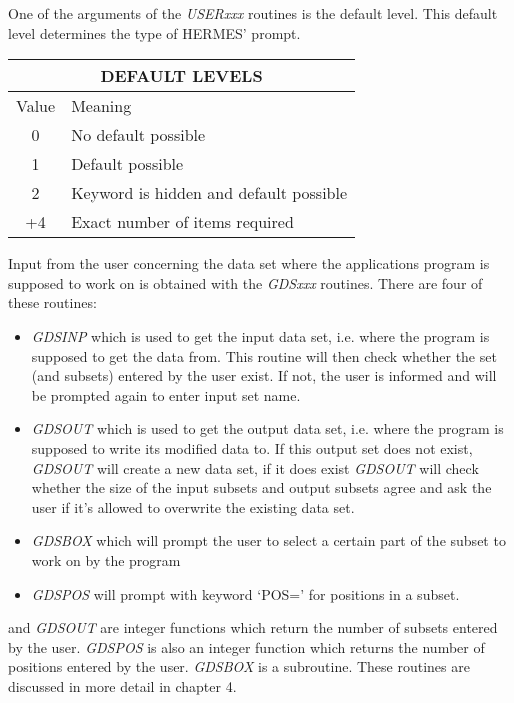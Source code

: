 \noindent One of the arguments of the {\sl USERxxx\/} routines is the
default level.  This default level determines the
type of HERMES' prompt.

\begin{center}
\begin{tabular}{|c|l|}
\hline
\multicolumn{2}{|c|}{DEFAULT LEVELS}\\
\hline
Value&Meaning\\
\hline
0&No default possible\\
1&Default possible\\
2&Keyword is hidden and default possible\\
+4&Exact number of items required\\
\hline
\end{tabular}
\end{center}

Input from the user concerning the data set where the applications
program is supposed to work on is obtained with the {\sl GDSxxx\/}
routines.  There are four of these routines:

\begin{itemize}

\item {\sl GDSINP\/} which is used to get the input data set, i.e.
where the program is supposed to get the data from.  This routine will
then check whether the set (and subsets) entered by the user exist.  If
not, the user is informed and will be prompted again to enter input set
name.

\item {\sl GDSOUT\/} which is used to get the output data set, i.e.
where the program is supposed to write its modified data to.  If this
output set does not exist, {\sl GDSOUT\/} will create a new data set, if
it does exist {\sl GDSOUT\/} will check whether the size of the input
subsets and output subsets agree and ask the user if it's allowed to
overwrite the existing data set.

\item {\sl GDSBOX\/} which will prompt the user to select a certain part
of the subset to work on by the program

\item {\sl GDSPOS\/} will prompt with keyword `POS=' for positions in a
subset.

\end{itemize}

 and {\sl GDSOUT} are integer functions which
return the number of subsets entered by the user.  {\sl GDSPOS\/} is
also an integer function which returns the number of positions entered
by the user.  {\sl GDSBOX\/} is a subroutine.  These routines are
discussed in more detail in chapter 4.

